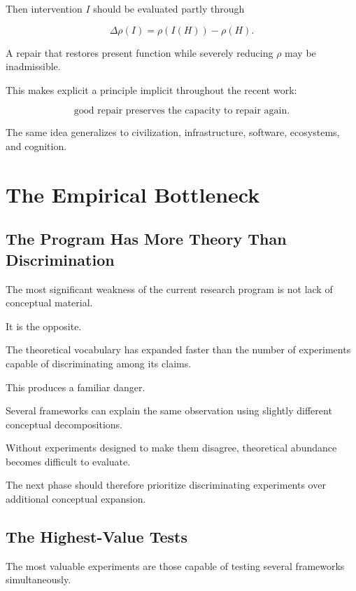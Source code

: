 \documentclass[11pt]{article}
\theoremstyle{remark}
\begin{document}
Then intervention $I$ should be evaluated partly through

\begin{equation}
\Delta\rho(I)
=
\rho(I(H))-\rho(H).
\end{equation}

A repair that restores present function while severely reducing $\rho$ may be inadmissible.

This makes explicit a principle implicit throughout the recent work:

\begin{equation}
\boxed{
\text{good repair preserves the capacity to repair again}.
}
\end{equation}

The same idea generalizes to civilization, infrastructure, software, ecosystems, and cognition.

\section{The Empirical Bottleneck}

\subsection{The Program Has More Theory Than Discrimination}

The most significant weakness of the current research program is not lack of conceptual material.

It is the opposite.

The theoretical vocabulary has expanded faster than the number of experiments capable of discriminating among its claims.

This produces a familiar danger.

Several frameworks can explain the same observation using slightly different conceptual decompositions.

Without experiments designed to make them disagree, theoretical abundance becomes difficult to evaluate.

The next phase should therefore prioritize discriminating experiments over additional conceptual expansion.

\subsection{The Highest-Value Tests}

The most valuable experiments are those capable of testing several frameworks simultaneously.
\end{document}
